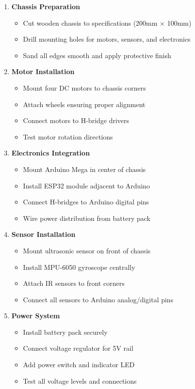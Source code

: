 \begin{enumerate}
    \item \textbf{Chassis Preparation}
    \begin{itemize}
        \item Cut wooden chassis to specifications (200mm × 100mm)
        \item Drill mounting holes for motors, sensors, and electronics
        \item Sand all edges smooth and apply protective finish
    \end{itemize}
    
    \item \textbf{Motor Installation}
    \begin{itemize}
        \item Mount four DC motors to chassis corners
        \item Attach wheels ensuring proper alignment
        \item Connect motors to H-bridge drivers
        \item Test motor rotation directions
    \end{itemize}
    
    \item \textbf{Electronics Integration}
    \begin{itemize}
        \item Mount Arduino Mega in center of chassis
        \item Install ESP32 module adjacent to Arduino
        \item Connect H-bridges to Arduino digital pins
        \item Wire power distribution from battery pack
    \end{itemize}
    
    \item \textbf{Sensor Installation}
    \begin{itemize}
        \item Mount ultrasonic sensor on front of chassis
        \item Install MPU-6050 gyroscope centrally
        \item Attach IR sensors to front corners
        \item Connect all sensors to Arduino analog/digital pins
    \end{itemize}
    
    \item \textbf{Power System}
    \begin{itemize}
        \item Install battery pack securely
        \item Connect voltage regulator for 5V rail
        \item Add power switch and indicator LED
        \item Test all voltage levels and connections
    \end{itemize}
\end{enumerate}

